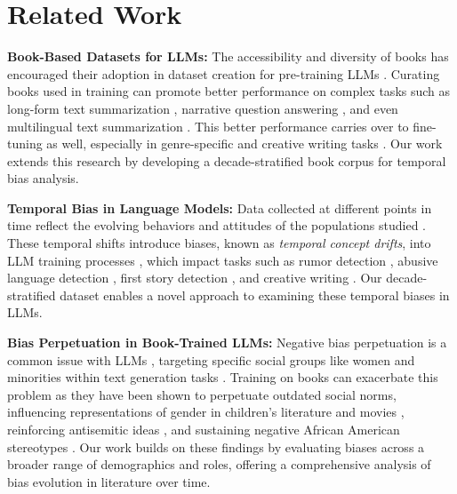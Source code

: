 \section{Related Work}
\textbf{Book-Based Datasets for LLMs:} The accessibility and diversity of books has encouraged their adoption in dataset creation for pre-training LLMs \cite{goldberg-orwant-2013-dataset, gao2020pile800gbdatasetdiverse, devlin2019bertpretrainingdeepbidirectional}. Curating books used in training can promote better performance on complex tasks such as long-form text summarization \cite{kryściński2022booksumcollectiondatasetslongform, ladhak-etal-2020-exploring}, narrative question answering \cite{kočiský2017narrativeqareadingcomprehensionchallenge}, and even multilingual text summarization \cite{scire-etal-2023-echoes}. This better performance carries over to fine-tuning as well, especially in genre-specific and creative writing tasks \cite{basyal2023textsummarizationusinglarge, agarwal-etal-2022-creativesumm, wang2024weaverfoundationmodelscreative}. Our work extends this research by developing a decade-stratified book corpus for temporal bias analysis.

\textbf{Temporal Bias in Language Models:} Data collected at different points in time reflect the evolving behaviors and attitudes of the populations studied \cite{olteanu2019social}. These temporal shifts introduce biases, known as \textit{temporal concept drifts}, into LLM training processes \cite{zhao-etal-2022-impact}, which impact tasks such as rumor detection \cite{mu-etal-2023-time}, abusive language detection \cite{jin2023examiningtemporalbiasabusive}, first story detection \cite{Wurzer_2020}, and creative writing \cite{10.1145/3532106.3533526}. Our decade-stratified dataset enables a novel approach to examining these temporal biases in LLMs.

\textbf{Bias Perpetuation in Book-Trained LLMs:} Negative bias perpetuation is a common issue with LLMs \cite{nissim-etal-2020-fair}, targeting specific social groups like women and minorities within text generation tasks \cite{abid2021persistentantimuslimbiaslarge, gonen-goldberg-2019-lipstick, sheng-etal-2019-woman}. Training on books can exacerbate this problem as they have been shown to perpetuate outdated social norms, influencing representations of gender in children's literature and movies \cite{toro-isaza-etal-2023-fairy, gooden2001gender, xu2019cinderella}, reinforcing antisemitic ideas \cite{tripodi-etal-2019-tracing}, and sustaining negative African American stereotypes \cite{kocyigit2023novelmethodanalysingracial}. Our work builds on these findings by evaluating biases across a broader range of demographics and roles, offering a comprehensive analysis of bias evolution in literature over time.
\vspace{-1.3mm}